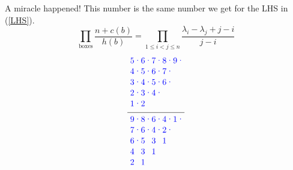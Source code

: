 \documentclass[a4paper,11pt]{amsart}
\begin{document}
A miracle happened! This number is the same number we get for the LHS in (\ref{LHS}).
\[\prod_{\text{boxes}}\dfrac{n+c(b)}{h(b)}=\prod_{1\leq i<j\leq n}\dfrac{\lambda_i-\lambda_j+j-i}{j-i}\]
\[\dfrac{%
				\begin{tikzpicture}[blue, yscale=-0.45, xscale=0.45]
					\node at (0.5,0.5) {5};
					\node at (1.5,0.5) {6};
					\node at (2.5,0.5) {7};
					\node at (3.5,0.5) {8};
					\node at (4.5,0.5) {9};
					\node at (0.5,1.5) {4};
					\node at (1.5,1.5) {5};
					\node at (2.5,1.5) {6};
					\node at (3.5,1.5) {7};
					\node at (0.5,2.5) {3};
					\node at (1.5,2.5) {4};
					\node at (2.5,2.5) {5};
					\node at (3.5,2.5) {6};
					\node at (0.5,3.5) {2};
					\node at (1.5,3.5) {3};
					\node at (2.5,3.5) {4};
					\node at (0.5,4.5) {1};
					\node at (1.5,4.5) {2};
					\node at (1,0.5) {$\cdot$};
					\node at (2,0.5) {$\cdot$};
					\node at (3,0.5) {$\cdot$};
					\node at (4,0.5) {$\cdot$};
					\node at (5,0.5) {$\cdot$};
					\node at (1,1.5) {$\cdot$};
					\node at (2,1.5) {$\cdot$};
					\node at (3,1.5) {$\cdot$};
					\node at (4,1.5) {$\cdot$};
					\node at (1,2.5) {$\cdot$};
					\node at (2,2.5) {$\cdot$};
					\node at (3,2.5) {$\cdot$};
					\node at (4,2.5) {$\cdot$};
					\node at (1,3.5) {$\cdot$};
					\node at (2,3.5) {$\cdot$};
					\node at (3,3.5) {$\cdot$};
					\node at (1,4.5) {$\cdot$};
				\end{tikzpicture}\hfill
			}
			{%
				\begin{tikzpicture}[blue,yscale=-0.45, xscale=0.45]
					\node at (0.5,0.5) {9};
					\node at (1.5,0.5) {8};
					\node at (2.5,0.5) {6};
					\node at (3.5,0.5) {4};
					\node at (4.5,0.5) {1};
					\node at (0.5,1.5) {7};
					\node at (1.5,1.5) {6};
					\node at (2.5,1.5) {4};
					\node at (3.5,1.5) {2};
					\node at (0.5,2.5) {6};
					\node at (1.5,2.5) {5};
					\node at (2.5,2.5) {3};
					\node at (3.5,2.5) {1};
					\node at (0.5,3.5) {4};
					\node at (1.5,3.5) {3};
					\node at (2.5,3.5) {1};
					\node at (0.5,4.5) {2};
					\node at (1.5,4.5) {1};
					\node at (1,0.5) {$\cdot$};
					\node at (2,0.5) {$\cdot$};
					\node at (3,0.5) {$\cdot$};
					\node at (4,0.5) {$\cdot$};
					\node at (5,0.5) {$\cdot$};
					\node at (1,1.5) {$\cdot$};
					\node at (2,1.5) {$\cdot$};
					\node at (3,1.5) {$\cdot$};
					\node at (4,1.5) {$\cdot$};
					\node at (1,2.5) {$\cdot$};

\end{tikzpicture}}\]
\end{document}
